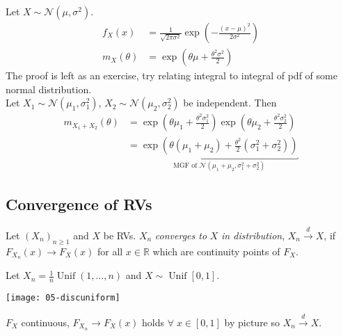 \begin{example} \label{exm:mgf-normal}
    Let $X \sim \mathcal{N}(\mu, \sigma^2)$.
    \begin{align*}
        f_X(x) &= \frac{1}{\sqrt{2 \pi \sigma^2}} \exp \left( - \frac{(x - \mu)^2}{2 \sigma^2} \right) \\
        m_X(\theta) &= \exp \left( \theta \mu + \frac{\theta^2 \sigma^2}{2} \right)
    \end{align*}
    The proof is left as an exercise, try relating integral to integral of pdf of some normal distribution. \\
    Let $X_1 \sim \mathcal{N}(\mu_1, \sigma_1^2)$, $X_2 \sim \mathcal{N}(\mu_2, \sigma_2^2)$ be independent.
    Then 
    \begin{align*}
        m_{X_1 + X_2}(\theta) &= \exp \left(\theta \mu_1 + \frac{\theta^2 \sigma_1^2}{2} \right) \exp \left( \theta \mu_2 + \frac{\theta^2 \sigma_2^2}{2} \right) \\
        &= \underbracket{\exp \left( \theta (\mu_1 + \mu_2) + \frac{\theta^2}{2} (\sigma_1^2 + \sigma_2^2) \right)}_{\text{MGF of } \mathcal{N}(\mu_1 + \mu_2, \sigma_1^2 + \sigma_2^2)}
    \end{align*}
\end{example}

\subsection{Convergence of RVs}

\begin{definition}
    Let $(X_n)_{n \geq 1}$ and $X$ be RVs.
    $X_n$ \emph{converges to} $X$ \emph{in distribution}, $X_n \overset{d}{\to} X$, if $F_{X_n}(x) \to F_X(x)$ for all $x \in \mathbb{R}$ which are continuity points of $F_X$.
\end{definition} 

\begin{example} \label{exm:conv1}
    Let $X_n = \frac{1}{n} \operatorname{Unif}\left( {1, \dots, n} \right)$ and $X \sim \operatorname{Unif} [0, 1]$.
    {\par \centering \texttt{[image: 05-discuniform]} \par}
    $F_X$ continuous, $F_{X_n} \to F_X(x)$ holds $\forall \; x \in [0, 1]$ by picture so $X_n \overset{d}{\to} X$.
\end{example} 

